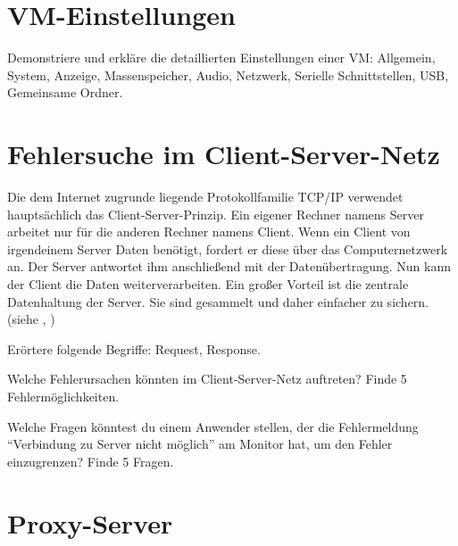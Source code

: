 \section{VM-Einstellungen}

\begin{aufgabe}
Demonstriere und erkläre die detaillierten Einstellungen einer VM: Allgemein, System, Anzeige, Massenspeicher, Audio, Netzwerk, Serielle Schnittstellen, USB, Gemeinsame Ordner.
\end{aufgabe}


\section{Fehlersuche im Client-Server-Netz}

\begin{aufgabe}
Die dem Internet zugrunde liegende Protokollfamilie TCP/IP verwendet hauptsächlich das Client-Server-Prinzip. Ein eigener Rechner namens Server arbeitet nur für die anderen Rechner namens Client. Wenn ein Client von irgendeinem Server Daten benötigt, fordert er diese über das Computernetzwerk an. Der Server antwortet ihm anschließend mit der Datenübertragung. Nun kann der Client die Daten weiterverarbeiten. Ein großer Vorteil ist die zentrale Datenhaltung der Server. Sie sind gesammelt und daher einfacher zu sichern. (siehe \angabeurlclientserver, \angabeurlverteilt)

Erörtere folgende Begriffe: Request, Response.
\end{aufgabe}


\begin{aufgabe}
Welche Fehlerursachen könnten im Client-Server-Netz auftreten? Finde 5 Fehlermöglichkeiten.
\end{aufgabe}


\begin{aufgabe}
Welche Fragen könntest du einem Anwender stellen, der die Fehlermeldung \enquote{Verbindung zu Server nicht möglich} am Monitor hat, um den Fehler einzugrenzen? Finde 5 Fragen.
\end{aufgabe}


\section{Proxy-Server}

